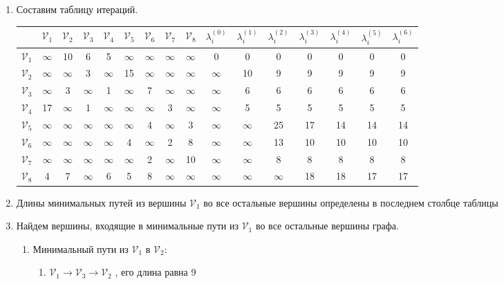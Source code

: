 \vspace{\baselineskip}
\begin{enumerate}
\item Составим таблицу итераций.

\begin{tabular}{|*{16}{c|}}
\hline
 &$\mathcal{V}_1$&$\mathcal{V}_2$&$\mathcal{V}_3$&$\mathcal{V}_4$&$\mathcal{V}_5$&$\mathcal{V}_6$&$\mathcal{V}_7$&$\mathcal{V}_8$&$\lambda^{(0)}_i$&$\lambda^{(1)}_i$&$\lambda^{(2)}_i$&$\lambda^{(3)}_i$&$\lambda^{(4)}_i$&$\lambda^{(5)}_i$&$\lambda^{(6)}_i$\\
 \hline
$\mathcal{V}_1$ &$\infty$&10&6&5&$\infty$&$\infty$&$\infty$&$\infty$&0&0&0&0&0&0&0 \\
\hline
$\mathcal{V}_2$& $\infty$&$\infty$&3&$\infty$&15&$\infty$&$\infty$&$\infty$&$\infty$&10&9&9&9&9&9 \\
\hline
$\mathcal{V}_3$&$\infty$&3&$\infty$&1&$\infty$&7&$\infty$&$\infty$&$\infty$&6&6&6&6&6&6 \\
\hline
$\mathcal{V}_4$&17&$\infty$&1&$\infty$&$\infty$&$\infty$&3&$\infty$&$\infty$&5&5&5&5&5&5 \\
\hline
$\mathcal{V}_5$&$\infty$&$\infty$&$\infty$&$\infty$&$\infty$&4&$\infty$&3&$\infty$&$\infty$&25&17&14&14&14 \\
\hline
$\mathcal{V}_6$&$\infty$&$\infty$&$\infty$&$\infty$&4&$\infty$&2&8&$\infty$&$\infty$&13&10&10&10&10 \\
\hline
$\mathcal{V}_7$&$\infty$&$\infty$&$\infty$&$\infty$&$\infty$&2&$\infty$&10&$\infty$&$\infty$&8&8&8&8&8 \\
\hline
$\mathcal{V}_8$&4&7&$\infty$&6&5&8&$\infty$&$\infty$&$\infty$&$\infty$&$\infty$&18&18&17&17\\
\hline
\end{tabular}

\item Длины минимальных путей из вершины $\mathcal{V}_1$ во все остальные вершины определены в последнем столбце таблицы

\item Найдем вершины, входящие в минимальные пути из $\mathcal{V}_1$ во все остальные вершины графа.
\begin{enumerate}
\item Минимальный пути из $\mathcal{V}_1$ в $\mathcal{V}_2$:
\begin{enumerate}
\item $\mathcal{V}_1\rightarrow\mathcal{V}_3\rightarrow\mathcal{V}_2$ , его длина равна 9


\end{enumerate}
\end{enumerate}
\end{enumerate}
